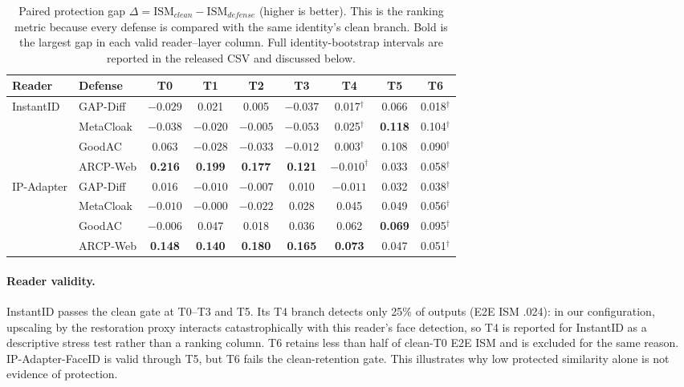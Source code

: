 \begin{table}[t]
\centering
\caption{Paired protection gap $\Delta=\mathrm{ISM}_{clean}-\mathrm{ISM}_{defense}$
(higher is better). This is the ranking metric because every defense is compared
with the same identity's clean branch. Bold is the largest gap in each valid
reader--layer column. Full identity-bootstrap intervals are reported in the
released CSV and discussed below.}
\label{tab:web4-gap}
\small
\renewcommand{\arraystretch}{1.18}
\setlength{\tabcolsep}{7pt}
\begin{tabular}{llccccccc}
\toprule
Reader & Defense & T0 & T1 & T2 & T3 & T4 & T5 & T6 \\
\midrule
\multirow{4}{*}{InstantID}
& GAP-Diff & $-0.029$ & 0.021 & 0.005 & $-0.037$ & 0.017$^\dagger$ & 0.066 & 0.018$^\dagger$ \\
& MetaCloak & $-0.038$ & $-0.020$ & $-0.005$ & $-0.053$ & 0.025$^\dagger$ & \textbf{0.118} & 0.104$^\dagger$ \\
& GoodAC & 0.063 & $-0.028$ & $-0.033$ & $-0.012$ & 0.003$^\dagger$ & 0.108 & 0.090$^\dagger$ \\
& ARCP-Web & \textbf{0.216} & \textbf{0.199} & \textbf{0.177} & \textbf{0.121} & $-0.010^\dagger$ & 0.033 & 0.058$^\dagger$ \\
\midrule
\multirow{4}{*}{IP-Adapter}
& GAP-Diff & 0.016 & $-0.010$ & $-0.007$ & 0.010 & $-0.011$ & 0.032 & 0.038$^\dagger$ \\
& MetaCloak & $-0.010$ & $-0.000$ & $-0.022$ & 0.028 & 0.045 & 0.049 & 0.056$^\dagger$ \\
& GoodAC & $-0.006$ & 0.047 & 0.018 & 0.036 & 0.062 & \textbf{0.069} & 0.095$^\dagger$ \\
& ARCP-Web & \textbf{0.148} & \textbf{0.140} & \textbf{0.180} & \textbf{0.165} & \textbf{0.073} & 0.047 & 0.051$^\dagger$ \\
\bottomrule
\end{tabular}
\end{table}

\paragraph{Reader validity.}
InstantID passes the clean gate at T0--T3 and T5. Its T4 branch detects only
25\% of outputs (E2E ISM .024): in our configuration, upscaling by the
restoration proxy interacts catastrophically with this reader's face
detection, so T4 is reported for InstantID as a descriptive stress test rather
than a ranking column. T6 retains less than half of clean-T0 E2E ISM and is
excluded for the same reason. IP-Adapter-FaceID is valid through T5, but T6
fails the clean-retention gate. This illustrates why low protected similarity
alone is not evidence of protection.

